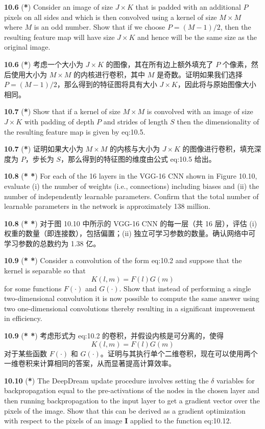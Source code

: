 \documentclass{article}
\begin{document}
\textbf{10.6} (\textbf{*}) Consider an image of size $J \times K$ that is padded with an additional $P$ pixels on all sides and which is then convolved using a kernel of size $M \times M$ where $M$ is an odd number. Show that if we choose $P = (M-1)/2$, then the resulting feature map will have size $J \times K$ and hence will be the same size as the original image.

\textbf{10.6} (\textbf{*}) 考虑一个大小为 $J \times K$ 的图像，其在所有边上额外填充了 $P$ 个像素，然后使用大小为 $M \times M$ 的内核进行卷积，其中 $M$ 是奇数。证明如果我们选择 $P = (M-1)/2$，那么得到的特征图将具有大小 $J \times K$，因此将与原始图像大小相同。

\textbf{10.7} (\textbf{*}) Show that if a kernel of size $M \times M$ is convolved with an image of size $J \times K$ with padding of depth $P$ and strides of length $S$ then the dimensionality of the resulting feature map is given by {eq:10.5}.

\textbf{10.7} (\textbf{*}) 证明如果大小为 $M \times M$ 的内核与大小为 $J \times K$ 的图像进行卷积，填充深度为 $P$，步长为 $S$，那么得到的特征图的维度由公式 {eq:10.5} 给出。

\textbf{10.8} (\textbf{* *}) For each of the 16 layers in the VGG-16 CNN shown in Figure 10.10, evaluate (i) the number of weights (i.e., connections) including biases and (ii) the number of independently learnable parameters. Confirm that the total number of learnable parameters in the network is approximately 138 million.

\textbf{10.8} (\textbf{* *}) 对于图 10.10 中所示的 VGG-16 CNN 的每一层（共 16 层），评估 (i) 权重的数量（即连接数），包括偏置；(ii) 独立可学习参数的数量。确认网络中可学习参数的总数约为 1.38 亿。

\textbf{10.9} (\textbf{* *}) Consider a convolution of the form {eq:10.2} and suppose that the kernel is separable so that
\[
K(l,m) = F(l)G(m)
\]
for some functions $F(\cdot)$ and $G(\cdot)$. Show that instead of performing a single two-dimensional convolution it is now possible to compute the same answer using two one-dimensional convolutions thereby resulting in a significant improvement in efficiency.

\textbf{10.9} (\textbf{* *}) 考虑形式为 {eq:10.2} 的卷积，并假设内核是可分离的，使得
\[
K(l,m) = F(l)G(m)
\]
对于某些函数 $F(\cdot)$ 和 $G(\cdot)$。证明与其执行单个二维卷积，现在可以使用两个一维卷积来计算相同的答案，从而显著提高计算效率。

\textbf{10.10} (\textbf{*}) The DeepDream update procedure involves setting the $\delta$ variables for backpropagation equal to the pre-activations of the nodes in the chosen layer and then running backpropagation to the input layer to get a gradient vector over the pixels of the image. Show that this can be derived as a gradient optimization with respect to the pixels of an image $\mathbf{I}$ applied to the function {eq:10.12}.
\end{document}
